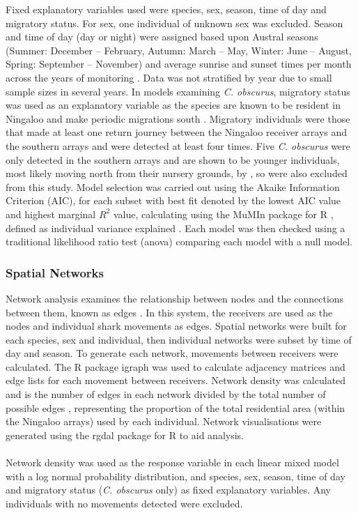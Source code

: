 \documentclass[11pt,a4paper]{article}
\begin{document}
	Fixed explanatory variables used were species, sex, season, time of day and migratory status. For sex, one individual of unknown sex was excluded. Season and time of day (day or night) were assigned based upon Austral seasons (Summer: December – February, Autumn: March – May, Winter: June – August, Spring: September – November) and average sunrise and sunset times per month across the years of monitoring \citep{GeoscienceAustralia2015}. Data was not stratified by year due to small sample sizes in several years. In models examining \textit{C. obscurus}, migratory status was used as an explanatory variable as the species are known to be resident in Ningaloo and make periodic migrations south \citep{Braccini2017b}. Migratory individuals were those that made at least one return journey between the Ningaloo receiver arrays and the southern arrays and were detected at least four times. Five \textit{C. obscurus} were only detected in the southern arrays and are shown to be younger individuals, most likely moving north from their nursery grounds, by \citealt{Braccini2017b}, so were also excluded from this study. Model selection was carried out using the Akaike Information Criterion (AIC), for each subset with best fit denoted by the lowest AIC value and highest marginal $R^2$ value, calculating using the MuMIn package for R \citep{Barton2019}, defined as individual variance explained \citep{Nakagawa2013}. Each model was then checked using a traditional likelihood ratio test (anova) comparing each model with a null model.\\
	
	
	\subsubsection{Spatial Networks}
	
	Network analysis examines the relationship between nodes and the connections between them, known as edges \citep{West2001}. In this system, the receivers are used as the nodes and individual shark movements as edges. Spatial networks were built for each species, sex and individual, then individual networks were subset by time of day and season. To generate each network, movements between receivers were calculated. The R package igraph \citep{Csardi2006} was used to calculate adjacency matrices and edge lists for each movement between receivers. Network density was calculated and is the number of edges in each network divided by the total number of possible edges \citep{Mourier2018}, representing the proportion of the total residential area (within the Ningaloo arrays) used by each individual. Network visualisations were generated using the rgdal package for R \citep{Bivand2019} to aid analysis. \\
	\\
	Network density was used as the response variable in each linear mixed model with a log normal probability distribution, and species, sex, season, time of day and migratory status (\textit{C. obscurus} only) as fixed explanatory variables. Any individuals with no movements detected were excluded. \\
	
\end{document}
